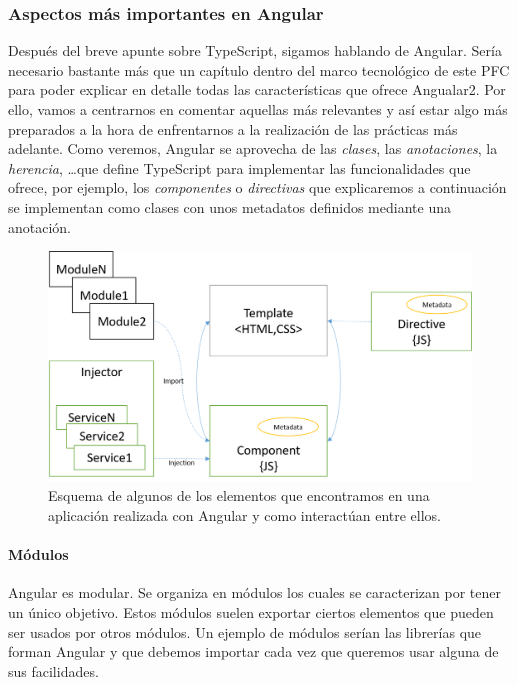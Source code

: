 \subsubsection{Aspectos más importantes en Angular}

\cite{Ang2EnrOriol,DiffCompDir} Después del breve apunte sobre TypeScript, sigamos hablando de Angular. Sería necesario bastante más que un capítulo dentro del marco tecnológico de este \gls{PFC} para poder explicar en detalle todas las características que ofrece Angualar2. Por ello, vamos a centrarnos en comentar aquellas más relevantes y así estar algo más preparados a la hora de enfrentarnos a la realización de las prácticas más adelante. Como veremos, Angular se aprovecha de las \emph{clases}, las \emph{anotaciones}, la \emph{herencia}, \ldots que define TypeScript para implementar las funcionalidades que ofrece, por ejemplo, los \emph{componentes} o \emph{directivas} que explicaremos a continuación se implementan como clases con unos metadatos definidos mediante una anotación.

\begin{figure}[h]
\centering
  \includegraphics[width=\textwidth]{Figures/ch1/angular/Angular2_diagram}
  \caption{Esquema de algunos de los elementos que encontramos en una aplicación realizada con Angular y como interactúan entre ellos.}
\end{figure}

\paragraph{Módulos} Angular es modular. Se organiza en módulos los cuales se caracterizan por tener un único objetivo. Estos módulos  suelen exportar ciertos elementos que pueden ser usados por otros módulos. Un ejemplo de módulos serían las librerías que forman Angular y que debemos importar cada vez que queremos usar alguna de sus facilidades.

